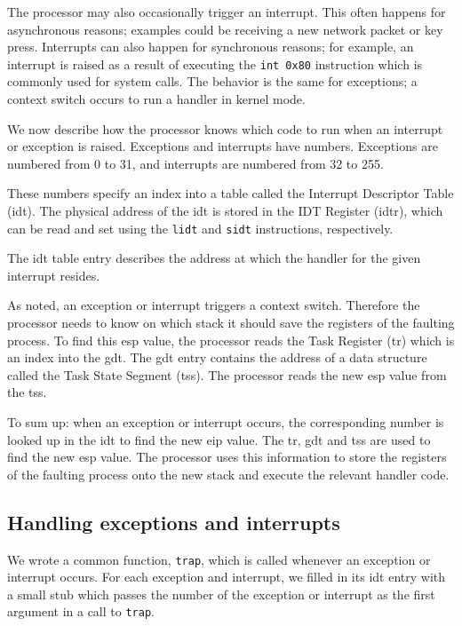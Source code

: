 \documentclass{article}
\begin{document}
The processor may also occasionally trigger an interrupt. This often happens
for asynchronous reasons; examples could be receiving a new network packet or
key press. Interrupts can also happen for synchronous reasons; for example, an
interrupt is raised as a result of executing the \texttt{int 0x80} instruction
which is commonly used for system calls. The behavior is the same for
exceptions; a context switch occurs to run a handler in kernel mode.

We now describe how the processor knows which code to run when an interrupt or
exception is raised. Exceptions and interrupts have numbers. Exceptions are
numbered from 0 to 31, and interrupts are numbered from 32 to 255.

These numbers specify an index into a table called the Interrupt Descriptor
Table (\gls{idt}). The physical address of the \gls{idt} is stored in the IDT
Register (\gls{idtr}), which can be read and set using the \texttt{lidt} and
\texttt{sidt} instructions, respectively.

The \gls{idt} table entry describes the address at which the handler for the
given interrupt resides.

As noted, an exception or interrupt triggers a context switch. Therefore the
processor needs to know on which stack it should save the registers of the
faulting process. To find this \gls{esp} value, the processor reads the Task
Register (\gls{tr}) which is an index into the \gls{gdt}. The \gls{gdt} entry
contains the address of a data structure called the Task State Segment
(\gls{tss}). The processor reads the new \gls{esp} value from the \gls{tss}.

To sum up: when an exception or interrupt occurs, the corresponding number is
looked up in the \gls{idt} to find the new \gls{eip} value. The \gls{tr},
\gls{gdt} and \gls{tss} are used to find the new \gls{esp} value. The
processor uses this information to store the registers of the faulting process
onto the new stack and execute the relevant handler code.


\subsection{Handling exceptions and interrupts}
We wrote a common function, \texttt{trap}, which is called whenever an
exception or interrupt occurs. For each exception and interrupt, we filled in
its \gls{idt} entry with a small stub which passes the number of the exception
or interrupt as the first argument in a call to \texttt{trap}.
\end{document}
